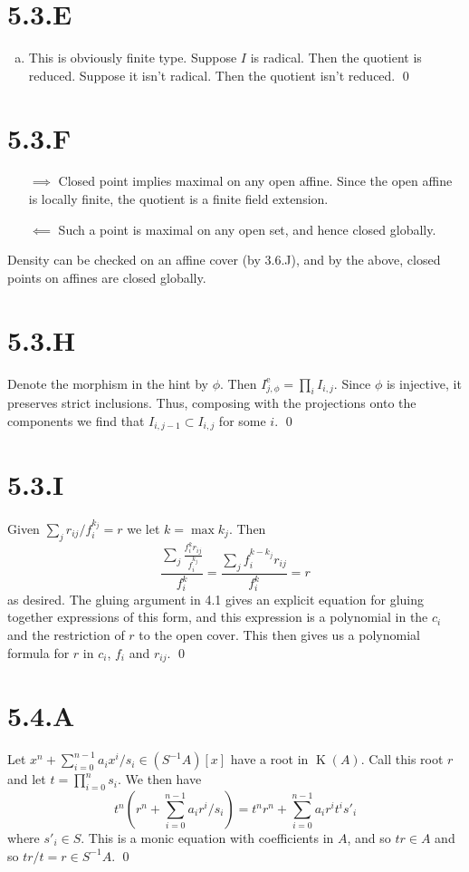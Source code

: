 \documentclass{article}
\begin{document}
\section{5.3.E}
\begin{enumerate}[a.]
    \item This is obviously finite type. Suppose $I$ is radical. Then
          the quotient is reduced. Suppose it isn't radical. Then the quotient isn't
          reduced. \qed
\end{enumerate}

\section{5.3.F}
\begin{enumerate}[a.]
    \item [$\implies$] Closed point implies maximal on any open affine. Since
          the open affine is locally finite, the quotient is a finite field extension.
    \item [$\impliedby$] Such a point is maximal on any open set, and hence
          closed globally.
\end{enumerate}
Density can be checked on an affine cover (by 3.6.J), and by the above, closed
points on affines are closed globally.

\section{5.3.H}
Denote the morphism in the hint by $\phi$. Then
$I_{j,\phi}^{\text{e}}=\prod_i I_{i,j}$. Since $\phi$ is injective, it
preserves strict inclusions. Thus, composing with the projections onto the
components we find that $I_{i,j-1} \subset I_{i,j}$ for some
$i$. \qed

\section{5.3.I}
Given $\sum_j r_{ij}/f_i^{k_j}=r$ we let $k=\max k_j$. Then
\[
    \frac{\sum_j \frac{f_i^kr_{ij}}{f_i^{k_j}}}{f_i^k}=\frac{\sum_j
    f_i^{k-k_j}r_{ij}}{f_i^k}=r
\] as desired. The gluing argument in 4.1 gives an explicit
equation for gluing together expressions of this form, and this expression is a
polynomial in the $c_i$ and the restriction of
$r$ to the open cover. This then gives us a polynomial
formula for $r$ in $c_i$,
$f_i$ and $r_{ij}$. \qed

\section{5.4.A}
Let $x^n+\sum_{i=0}^{n-1} a_ix^i/s_i \in (S^{-1}A)[x]$ have a root in $\operatorname{K}(A)$. Call this
root $r$ and let $t=\prod_{i=0}^n s_i$. We then have
\[
    t^n(r^n+\sum_{i=0}^{n-1} a_ir^i/s_i)=t^nr^n+\sum_{i=0}^{n-1}
    a_ir^it^is'_i
\] where $s'_i \in S$. This is a monic equation
with coefficients in $A$, and so $tr \in A$
and so $tr/t=r \in S^{-1}A$. \qed
\end{document}
